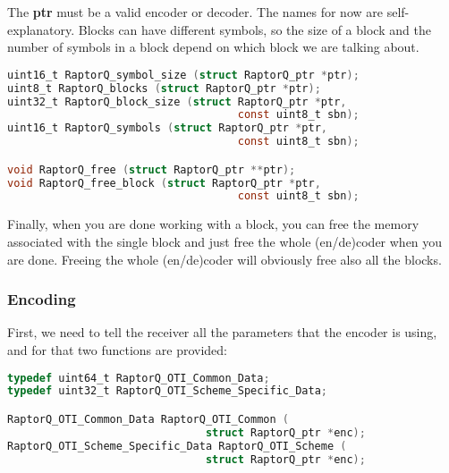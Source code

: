 \documentclass[11pt,a4paper]{refart}
\begin{document}
The \textbf{ptr} must be a valid encoder or decoder.
The names for now are self-explanatory. Blocks can have different symbols, so the size of a block and the number of symbols in a block
depend on which block we are talking about.

\begin{lstlisting}[language=C]
uint16_t RaptorQ_symbol_size (struct RaptorQ_ptr *ptr);
uint8_t RaptorQ_blocks (struct RaptorQ_ptr *ptr);
uint32_t RaptorQ_block_size (struct RaptorQ_ptr *ptr,
                                    const uint8_t sbn);
uint16_t RaptorQ_symbols (struct RaptorQ_ptr *ptr,
                                    const uint8_t sbn);

void RaptorQ_free (struct RaptorQ_ptr **ptr);
void RaptorQ_free_block (struct RaptorQ_ptr *ptr,
                                    const uint8_t sbn);
\end{lstlisting}
Finally, when you are done working with a block, you can free the memory associated with the single block
and just free the whole (en/de)coder when you are done. Freeing the whole (en/de)coder will obviously free
also all the blocks.


\newpage
\subsubsection{Encoding}

First, we need to tell the receiver all the parameters that the encoder is using, and for that two functions are provided:

\begin{lstlisting}[language=C]
typedef uint64_t RaptorQ_OTI_Common_Data;
typedef uint32_t RaptorQ_OTI_Scheme_Specific_Data;

RaptorQ_OTI_Common_Data RaptorQ_OTI_Common (
                               struct RaptorQ_ptr *enc);
RaptorQ_OTI_Scheme_Specific_Data RaptorQ_OTI_Scheme (
                               struct RaptorQ_ptr *enc);
\end{lstlisting}

\end{document}
